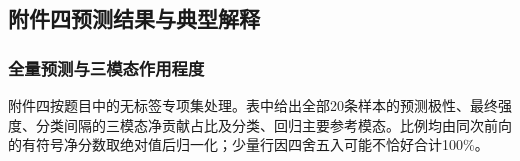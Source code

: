 \hypertarget{q3-ux9644ux4ef6ux56dbux9884ux6d4bux7ed3ux679cux4e0eux5178ux578bux89e3ux91ca}{%
\subsection{附件四预测结果与典型解释}\label{q3-ux9644ux4ef6ux56dbux9884ux6d4bux7ed3ux679cux4e0eux5178ux578bux89e3ux91ca}}

\hypertarget{q3-ux5168ux91cfux9884ux6d4bux4e0eux4e09ux6a21ux6001ux4f5cux7528ux7a0bux5ea6}{%
\subsubsection{全量预测与三模态作用程度}\label{q3-ux5168ux91cfux9884ux6d4bux4e0eux4e09ux6a21ux6001ux4f5cux7528ux7a0bux5ea6}}

附件四按题目中的无标签专项集处理。表中给出全部20条样本的预测极性、最终强度、分类间隔的三模态净贡献占比及分类、回归主要参考模态。比例均由同次前向的有符号净分数取绝对值后归一化；少量行因四舍五入可能不恰好合计100\%。


